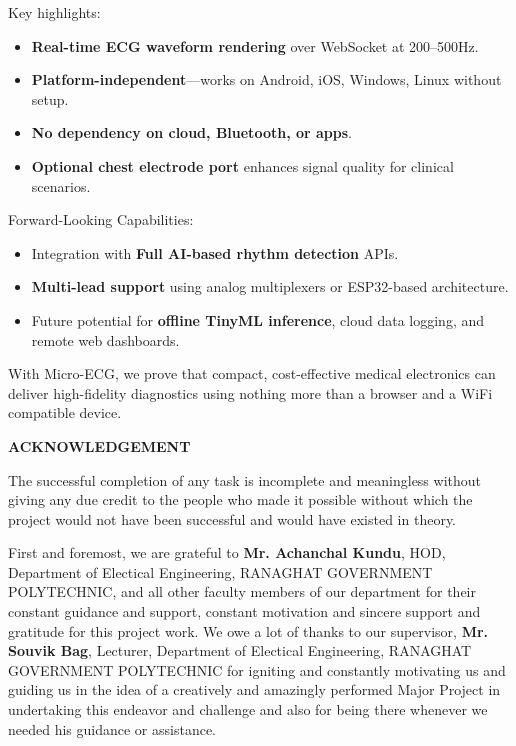 \documentclass[12pt,a4paper]{report}
\begin{document}
\vspace{10pt}
\noindent
Key highlights:
\begin{itemize}
    \item \textbf{Real-time ECG waveform rendering} over WebSocket at 200–500Hz.
    \item \textbf{Platform-independent}—works on Android, iOS, Windows, Linux without setup.
    \item \textbf{No dependency on cloud, Bluetooth, or apps}.
    \item \textbf{Optional chest electrode port} enhances signal quality for clinical scenarios.
\end{itemize}

\vspace{10pt}
\noindent
Forward-Looking Capabilities:
\begin{itemize}
    \item Integration with \textbf{Full AI-based rhythm detection} APIs.
    \item \textbf{Multi-lead support} using analog multiplexers or ESP32-based architecture.
    \item Future potential for \textbf{offline TinyML inference}, cloud data logging, and remote web dashboards.
\end{itemize}

\noindent
With Micro-ECG, we prove that compact, cost-effective medical electronics can deliver high-fidelity diagnostics using nothing more than a browser and a WiFi compatible device.



\newpage
\begin{center}
 \textbf{ACKNOWLEDGEMENT}
\end{center}

The successful completion of any task is incomplete and meaningless without giving any due credit to the people who made it possible without which the project would not have been successful and would have existed in theory.

First and foremost, we are grateful to \textbf{Mr. Achanchal Kundu}, HOD, Department of Electical Engineering, RANAGHAT GOVERNMENT POLYTECHNIC, and all other faculty members of our department for their constant guidance and support, constant motivation and sincere support and gratitude for this project work. We owe a lot of thanks to our supervisor, \textbf{Mr. Souvik Bag}, Lecturer, Department of Electical Engineering, RANAGHAT GOVERNMENT POLYTECHNIC for igniting and constantly motivating us and guiding us in the idea of a creatively and amazingly performed Major Project in undertaking this endeavor and challenge and also for being there whenever we needed his guidance or assistance.
\end{document}
